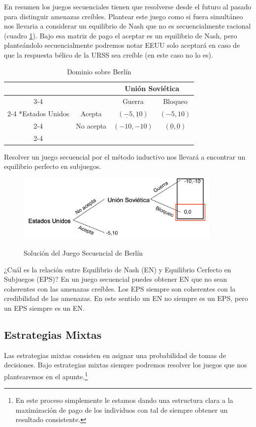 En resumen los juegos secuenciales tienen que resolverse desde el futuro al pasado para distinguir amenazas creíbles. Plantear este juego como si fuera simultáneo nos llevaria a considerar un equilibrio de Nash que no es secuencialmente racional (cuadro \ref{simult Berlín}). Bajo esa matriz de pago el aceptar es un equilibrio de Nash, pero planteándolo secuencialmente podremos notar EEUU solo aceptará en caso de que la respuesta bélico de la URSS sea creíble (en este caso no lo es).

\begin{table}[!htbp]
    \centering
    \caption{Dominio sobre Berlín}
    \setlength{\extrarowheight}{2pt}
    \begin{tabular}{*{4}{c|}}
      \multicolumn{2}{c}{} & \multicolumn{2}{c}{Unión Soviética}\\\cline{3-4}
      \multicolumn{1}{c}{} &  & Guerra & Bloqueo \\\cline{2-4}
      \multirow{2}*{Estados Unidos}  & Acepta & $(\underbar{-5},\underbar{10})$ & $(-5,10)$ \\\cline{2-4}
      & No acepta & $(-10,-10)$ & $(\underbar{0},\underbar{0})$ \\\cline{2-4}
    \end{tabular} \label{simult Berlín}
  \end{table}

Resolver un juego secuencial por el método inductivo nos llevará a encontrar un equilibrio perfecto en subjuegos. 

\begin{figure}[htb]
  \centering
  \caption{Solución del Juego Secuencial de Berlín}
  \includegraphics[width=10cm]{Figuras/Inducción.png}
  \label{Solución Soviética}
\end{figure}

¿Cuál es la relación entre Equilibrio de Nash (EN) y Equilibrio Cerfecto en Subjuegos (EPS)? En un juego secuencial puedes obtener EN que no sean coherentes con las amenazas creíbles. Los EPS siempre son coherentes con la credibilidad de las amenazas. En este sentido un EN no siempre es un EPS, pero un EPS siempre es un EN.

\subsection{Estrategias Mixtas}

Las estrategias mixtas consisten en asignar una probabilidad de tomas de decisiones. Bajo estrategias mixtas siempre podremos resolver los juegos que nos plantearemos en el apunte.\footnote{En este proceso simplemente le estamos dando una estructura clara a la maximización de pago de los individuos con tal de siempre obtener un resultado consistente.}